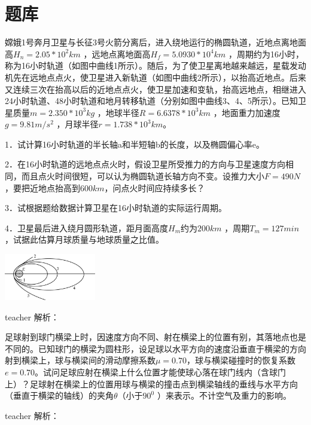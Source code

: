 
\chapter{题库}



\begin{example}
	嫦娥1号奔月卫星与长征3号火箭分离后，进入绕地运行的椭圆轨道，近地点离地面高$H_n=2.05*10^2km$ ，远地点离地面高$H_f=5.0930*10^4km$ ，周期约为16小时，称为16小时轨道（如图中曲线1所示）。随后，为了使卫星离地越来越远，星载发动机先在远地点点火，使卫星进入新轨道（如图中曲线2所示），以抬高近地点。后来又连续三次在抬高以后的近地点点火，使卫星加速和变轨，抬高远地点，相继进入24小时轨道、48小时轨道和地月转移轨道（分别如图中曲线3、4、5所示）。已知卫星质量$m=2.350*10^3kg$ ，地球半径$R=6.6378*10^3km$ ，地面重力加速度$g=9.81m/s^2$ ，月球半径$r=1.738*10^3km$。
	
	1．试计算16小时轨道的半长轴a和半短轴b的长度，以及椭圆偏心率e。
	
	2．在16小时轨道的远地点点火时，假设卫星所受推力的方向与卫星速度方向相同，而且点火时间很短，可以认为椭圆轨道长轴方向不变。设推力大小$F=490N$ ，要把近地点抬高到$600km$，问点火时间应持续多长？
	
	3．试根据题给数据计算卫星在16小时轨道的实际运行周期。
	
	4．卫星最后进入绕月圆形轨道，距月面高度$H_m$约为$200km$ ，周期$T_m=127min$，试据此估算月球质量与地球质量之比值。
	
\begin{flushright}
\includegraphics[width = 0.3\textwidth]{images/problem-1.pdf} 
\end{flushright}
\begin{taggedblock}{teacher}
解析：
\end{taggedblock}
\end{example}


\begin{example}
	足球射到球门横梁上时，因速度方向不同、射在横梁上的位置有别，其落地点也是不同的。已知球门的横梁为圆柱形，设足球以水平方向的速度沿垂直于横梁的方向射到横梁上，球与横梁间的滑动摩擦系数$\mu=0.70$，球与横梁碰撞时的恢复系数$e=0.70$。试问足球应射在横梁上什么位置才能使球心落在球门线内（含球门上）？足球射在横梁上的位置用球与横梁的撞击点到横梁轴线的垂线与水平方向（垂直于横梁的轴线）的夹角$\theta$（小于$90^0$ ）来表示。不计空气及重力的影响。
\begin{taggedblock}{teacher}
解析：
\end{taggedblock}
\end{example}


